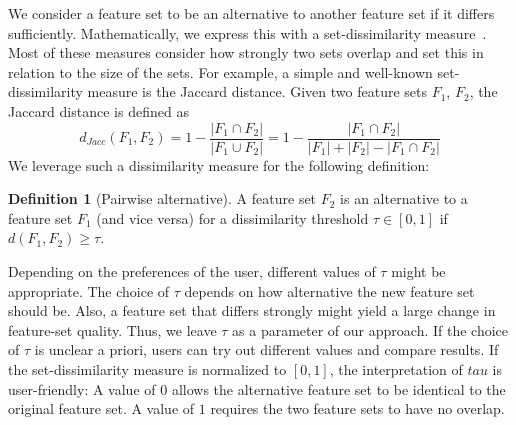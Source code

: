 \documentclass{article}
\theoremstyle{definition}
\newtheorem{definition}{Definition}
\begin{document}
We consider a feature set to be an alternative to another feature set if it differs sufficiently.
Mathematically, we express this with a set-dissimilarity measure~\cite{egghe2009new}.
Most of these measures consider how strongly two sets overlap and set this in relation to the size of the sets.
For example, a simple and well-known set-dissimilarity measure is the Jaccard distance.
Given two feature sets $F_1$, $F_2$, the Jaccard distance is defined as
%
\begin{equation}
	d_{Jacc}(F_1,F_2) = 1 - \frac{|F_1 \cap F_2|}{|F_1 \cup F_2|} = 1 - \frac{|F_1 \cap F_2|}{|F_1| + |F_2| - |F_1 \cap F_2|}
	\label{eq:jaccard}
\end{equation}
%
We leverage such a dissimilarity measure for the following definition:
%
\begin{definition}[Pairwise alternative]
	A feature set $F_2$ is an alternative to a feature set $F_1$ (and vice versa) for a dissimilarity threshold $\tau \in [0,1]$ if $d(F_1,F_2) \geq \tau$.
	\label{def:single-alternative}
\end{definition}
%
Depending on the preferences of the user, different values of $\tau$ might be appropriate.
The choice of $\tau$ depends on how alternative the new feature set should be.
Also, a feature set that differs strongly might yield a large change in feature-set quality.
Thus, we leave $\tau$ as a parameter of our approach.
If the choice of $\tau$ is unclear a priori, users can try out different values and compare results.
If the set-dissimilarity measure is normalized to $[0,1]$, the interpretation of $tau$ is user-friendly:
A value of $0$ allows the alternative feature set to be identical to the original feature set.
A value of $1$ requires the two feature sets to have no overlap.
\end{document}
